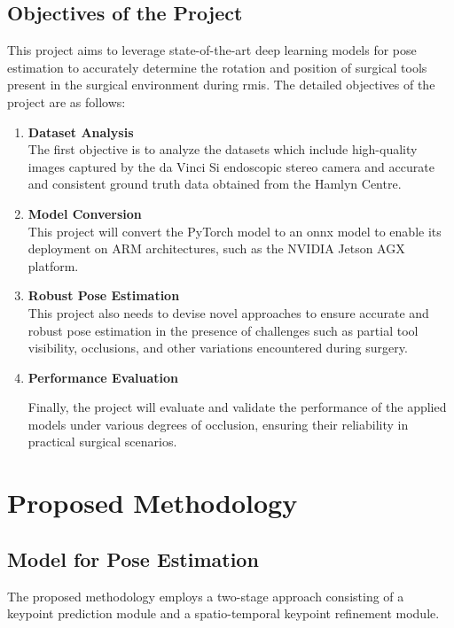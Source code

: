 \documentclass[12pt]{article}
\begin{document}
\subsection{Objectives of the Project}
This project aims to leverage state-of-the-art deep learning models for pose estimation to accurately determine the rotation and position of surgical tools present in the surgical environment during \gls{rmis}. The detailed objectives of the project are as follows:

\begin{enumerate}

\item \textbf{Dataset Analysis}
\\The first objective is to analyze the datasets which include high-quality images captured by the da Vinci Si endoscopic stereo camera and accurate and consistent ground truth data obtained from the Hamlyn Centre.

\item \textbf{Model Conversion}
\\This project will convert the PyTorch model to an \gls{onnx} model to enable its deployment on ARM architectures, such as the NVIDIA Jetson AGX platform.



\item \textbf{Robust Pose Estimation}
\\This project also needs to devise novel approaches to ensure accurate and robust pose estimation in the presence of challenges such as partial tool visibility, occlusions, and other variations encountered during surgery. 

\item \textbf{Performance Evaluation}

Finally, the project will evaluate and validate the performance of the applied models under various degrees of occlusion, ensuring their reliability in practical surgical scenarios.

\end{enumerate}



\section{Proposed Methodology}
\subsection{Model for Pose Estimation}
The proposed methodology employs a two-stage approach consisting of a keypoint prediction module and a spatio-temporal keypoint refinement module\cite{xu2023graph}.
\end{document}
